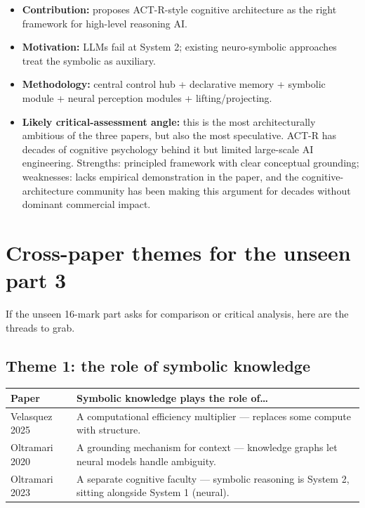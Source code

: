 \documentclass[11pt, a4paper]{article}
\newcommand{\thead}[1]{\textbf{#1}}
\begin{document}
\begin{itemize}
  \item \textbf{Contribution:} proposes ACT-R-style cognitive architecture as the right framework for high-level reasoning AI.
  \item \textbf{Motivation:} LLMs fail at System 2; existing neuro-symbolic approaches treat the symbolic as auxiliary.
  \item \textbf{Methodology:} central control hub + declarative memory + symbolic module + neural perception modules + lifting/projecting.
  \item \textbf{Likely critical-assessment angle:} this is the most architecturally ambitious of the three papers, but also the most speculative. ACT-R has decades of cognitive psychology behind it but limited large-scale AI engineering. Strengths: principled framework with clear conceptual grounding; weaknesses: lacks empirical demonstration in the paper, and the cognitive-architecture community has been making this argument for decades without dominant commercial impact.
\end{itemize}

\section{Cross-paper themes for the unseen part 3}

If the unseen 16-mark part asks for comparison or critical analysis, here are the threads to grab.

\subsection{Theme 1: the role of symbolic knowledge}

\begin{center}
\begin{tabular}{@{}p{3cm}p{11cm}@{}}
\toprule
\thead{Paper} & \thead{Symbolic knowledge plays the role of\dots} \\
\midrule
Velasquez 2025 & A computational efficiency multiplier — replaces some compute with structure. \\
Oltramari 2020 & A grounding mechanism for context — knowledge graphs let neural models handle ambiguity. \\
Oltramari 2023 & A separate cognitive faculty — symbolic reasoning is System 2, sitting alongside System 1 (neural). \\
\bottomrule
\end{tabular}
\end{center}
\end{document}
